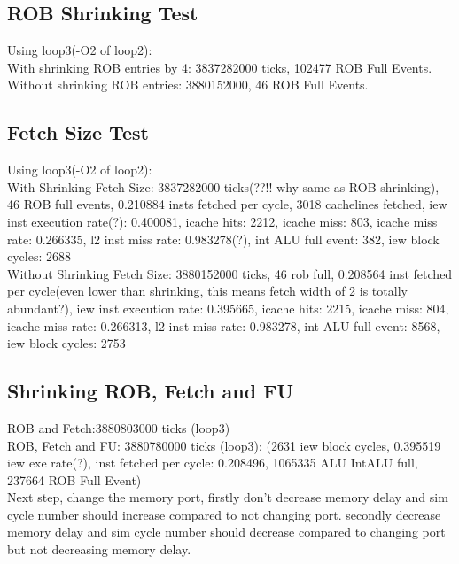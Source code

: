 \documentclass[11pt]{article}
\begin{document}
\subsection{ROB Shrinking Test}
Using loop3(-O2 of loop2): \\

With shrinking ROB entries by 4: 3837282000 ticks, 102477 ROB Full Events.\\

Without shrinking ROB entries: 3880152000, 46 ROB Full Events.

\subsection{Fetch Size Test}
Using loop3(-O2 of loop2): \\
With Shrinking Fetch Size: 3837282000 ticks(??!! why same as ROB shrinking), 46 ROB full events, 0.210884 insts fetched per cycle, 3018 cachelines fetched, iew inst execution rate(?): 0.400081, icache hits: 2212, icache miss: 803, icache miss rate: 0.266335, l2 inst miss rate: 0.983278(?), int ALU full event: 382, iew block cycles: 2688\\

Without Shrinking Fetch Size: 3880152000 ticks, 46 rob full, 0.208564 inst fetched per cycle(even lower than shrinking, this means fetch width of 2 is totally abundant?), iew inst execution rate: 0.395665, icache hits: 2215, icache miss: 804, icache miss rate: 0.266313, l2 inst miss rate: 0.983278, int ALU full event: 8568, iew block cycles: 2753\\ 

\subsection{Shrinking ROB, Fetch and FU}

\-\hspace{0.465cm} ROB and Fetch:3880803000 ticks (loop3)\\

ROB, Fetch and FU: 3880780000 ticks (loop3): (2631 iew block cycles, 0.395519 iew exe rate(?), inst fetched per cycle: 0.208496, 1065335 ALU IntALU full, 237664 ROB Full Event)\\

Next step, change the memory port, firstly don't decrease memory delay and sim cycle number should increase compared to not changing port. secondly decrease memory delay and sim cycle number should decrease compared to changing port but not decreasing memory delay.
\end{document}
